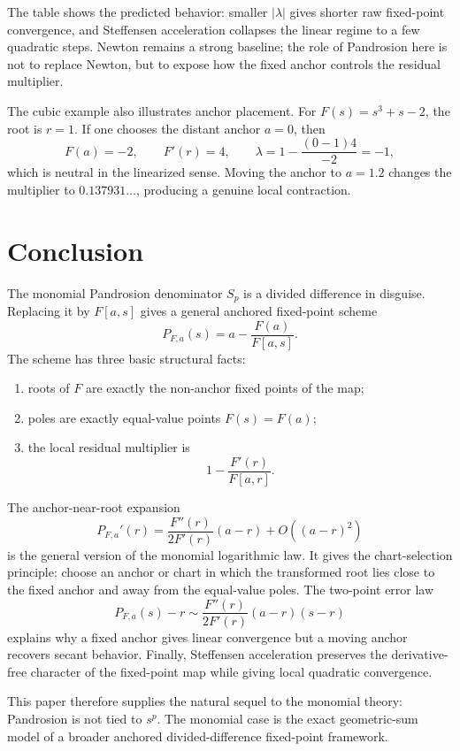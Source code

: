 \documentclass[11pt]{article}
\theoremstyle{definition}
\begin{document}
The table shows the predicted behavior: smaller $|\lambda|$ gives shorter raw fixed-point convergence, and Steffensen acceleration collapses the linear regime to a few quadratic steps.  Newton remains a strong baseline; the role of Pandrosion here is not to replace Newton, but to expose how the fixed anchor controls the residual multiplier.

The cubic example also illustrates anchor placement.  For $F(s)=s^3+s-2$, the root is $r=1$.  If one chooses the distant anchor $a=0$, then
\[
        F(a)=-2,
        \qquad F'(r)=4,
        \qquad \lambda=1-\frac{(0-1)4}{-2}=-1,
\]
which is neutral in the linearized sense.  Moving the anchor to $a=1.2$ changes the multiplier to $0.137931\ldots$, producing a genuine local contraction.

\section{Conclusion}

The monomial Pandrosion denominator $S_p$ is a divided difference in disguise.  Replacing it by $F[a,s]$ gives a general anchored fixed-point scheme
\[
        P_{F,a}(s)=a-\frac{F(a)}{F[a,s]}.
\]
The scheme has three basic structural facts:
\begin{enumerate}[label=\textup{(\roman*)},leftmargin=*]
\item roots of $F$ are exactly the non-anchor fixed points of the map;
\item poles are exactly equal-value points $F(s)=F(a)$;
\item the local residual multiplier is
\[
        1-\frac{F'(r)}{F[a,r]}.
\]
\end{enumerate}

The anchor-near-root expansion
\[
        P_{F,a}'(r)=\frac{F''(r)}{2F'(r)}(a-r)+O((a-r)^2)
\]
is the general version of the monomial logarithmic law.  It gives the chart-selection principle: choose an anchor or chart in which the transformed root lies close to the fixed anchor and away from the equal-value poles.  The two-point error law
\[
        P_{F,a}(s)-r\sim \frac{F''(r)}{2F'(r)}(a-r)(s-r)
\]
explains why a fixed anchor gives linear convergence but a moving anchor recovers secant behavior.  Finally, Steffensen acceleration preserves the derivative-free character of the fixed-point map while giving local quadratic convergence.

This paper therefore supplies the natural sequel to the monomial theory: Pandrosion is not tied to $s^p$.  The monomial case is the exact geometric-sum model of a broader anchored divided-difference fixed-point framework.
\end{document}
